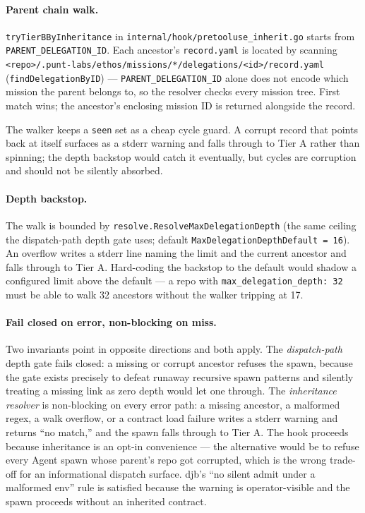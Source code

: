 \documentclass[a4paper,10pt]{article}
\newcommand{\fpath}[1]{\texttt{#1}}
\begin{document}
\paragraph{Parent chain walk.}
\texttt{tryTierBByInheritance} in
\fpath{internal/hook/pretooluse\_inherit.go} starts from
\texttt{PARENT\_DELEGATION\_ID}.  Each ancestor's
\fpath{record.yaml} is located by scanning
\fpath{<repo>/.punt-labs/ethos/missions/*/delegations/<id>/record.yaml}
(\texttt{findDelegationByID}) --- \texttt{PARENT\_DELEGATION\_ID}
alone does not encode which mission the parent belongs to, so the
resolver checks every mission tree.  First match wins; the
ancestor's enclosing mission ID is returned alongside the record.

The walker keeps a \texttt{seen} set as a cheap cycle guard.  A
corrupt record that points back at itself surfaces as a stderr
warning and falls through to Tier A rather than spinning; the
depth backstop would catch it eventually, but cycles are
corruption and should not be silently absorbed.

\paragraph{Depth backstop.}  The walk is bounded by
\texttt{resolve.ResolveMaxDelegationDepth} (the same ceiling the
dispatch-path depth gate uses; default
\texttt{MaxDelegationDepthDefault = 16}).  An overflow writes a
stderr line naming the limit and the current ancestor and falls
through to Tier A.  Hard-coding the backstop to the default
would shadow a configured limit above the default --- a repo with
\texttt{max\_delegation\_depth: 32} must be able to walk 32
ancestors without the walker tripping at 17.

\paragraph{Fail closed on error, non-blocking on miss.}  Two
invariants point in opposite directions and both apply.  The
\emph{dispatch-path} depth gate fails closed: a missing or
corrupt ancestor refuses the spawn, because the gate exists
precisely to defeat runaway recursive spawn patterns and
silently treating a missing link as zero depth would let one
through.  The \emph{inheritance resolver} is non-blocking on
every error path: a missing ancestor, a malformed regex, a walk
overflow, or a contract load failure writes a stderr warning and
returns ``no match,'' and the spawn falls through to Tier A.
The hook proceeds because inheritance is an opt-in convenience
--- the alternative would be to refuse every Agent spawn whose
parent's repo got corrupted, which is the wrong trade-off for
an informational dispatch surface.  djb's ``no silent admit
under a malformed env'' rule is satisfied because the warning
is operator-visible and the spawn proceeds without an inherited
contract.
\end{document}
